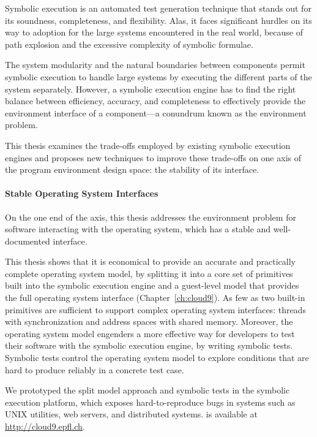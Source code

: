 Symbolic execution is an automated test generation technique that stands out for its soundness, completeness, and flexibility.
%
Alas, it faces significant hurdles on its way to adoption for the large systems encountered in the real world, because of path explosion and the excessive complexity of symbolic formulae.


The system modularity and the natural boundaries between components permit symbolic execution to handle large systems by executing the different parts of the system separately.
%
However, a symbolic execution engine has to find the right balance between efficiency, accuracy, and completeness to effectively provide the environment interface of a component---a conundrum known as the environment problem.


This thesis examines the trade-offs employed by existing symbolic execution engines and proposes new techniques to improve these trade-offs on one axis of the program environment design space: the stability of its interface.


\paragraph{Stable Operating System Interfaces}

On the one end of the axis, this thesis addresses the environment problem for software interacting with the operating system, which has a stable and well-documented interface.

This thesis shows that it is economical to provide an accurate and practically complete operating system model, by splitting it into a core set of primitives built into the symbolic execution engine and a guest-level model that provides the full operating system interface (Chapter~\ref{ch:cloud9}).
%
As few as two built-in primitives are sufficient to support complex operating system interfaces: threads with synchronization and address spaces with shared memory.
%
Moreover, the operating system model engenders a more effective way for developers to test their software with the symbolic execution engine, by writing symbolic tests.  Symbolic tests control the operating system model to explore conditions that are hard to produce reliably in a concrete test case.

We prototyped the split model approach and symbolic tests in the \cnine symbolic execution platform, which exposes hard-to-reproduce bugs in systems such as UNIX utilities, web servers, and distributed systems.
%
\cnine is available at {\url{http://cloud9.epfl.ch}}.


